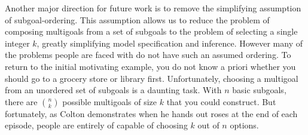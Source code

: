\documentclass[10pt,letterpaper]{article}
\begin{document}
Another major direction for future work is to remove the simplifying assumption of subgoal-ordering. This assumption allows us to reduce the problem of composing multigoals from a set of subgoals to the problem of selecting a single integer $k$, greatly simplifying model specification and inference. However many of the problems people are faced with do not have such an assumed ordering. To return to the initial motivating example, you do not know a priori whether you should go to a grocery store or library first. Unfortunately, choosing a multigoal from an unordered set of subgoals is a daunting task. With $n$ basic subgoals, there are $\binom{n}{k}$ possible multigoals of size $k$ that you could construct. But fortunately, as Colton demonstrates when he hands out roses at the end of each episode, people are entirely of capable of choosing $k$ out of $n$ options.






\setlength{\bibleftmargin}{.125in}
\setlength{\bibindent}{-\bibleftmargin}
\renewcommand*{\bibfont}{\footnotesize}

\end{document}
